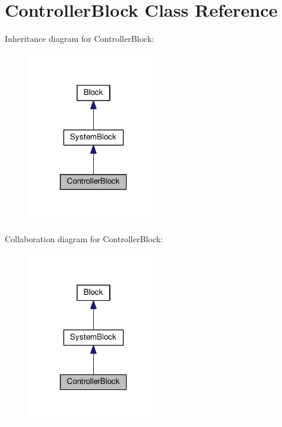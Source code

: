 \hypertarget{classControllerBlock}{}\section{Controller\+Block Class Reference}
\label{classControllerBlock}


Inheritance diagram for Controller\+Block\+:\nopagebreak
\begin{figure}[H]
\begin{center}
\leavevmode
\includegraphics[width=163pt]{classControllerBlock__inherit__graph}
\end{center}
\end{figure}


Collaboration diagram for Controller\+Block\+:\nopagebreak
\begin{figure}[H]
\begin{center}
\leavevmode
\includegraphics[width=163pt]{classControllerBlock__coll__graph}
\end{center}
\end{figure}

